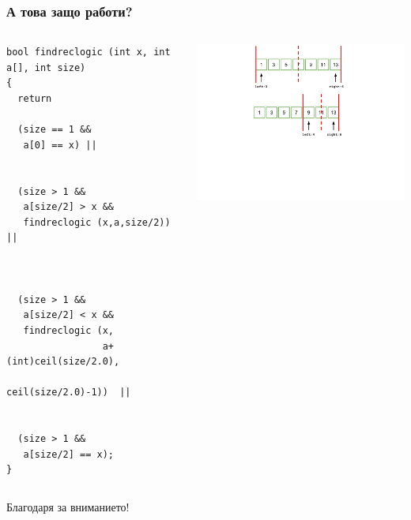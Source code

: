 \documentclass{beamer}
\begin{document}
\begin{frame}[fragile]
\frametitle{А това защо работи?}



\begin{columns}[t]
  \begin{column}{0.5\textwidth}

\begin{lstlisting}
bool findreclogic (int x, int a[], int size)
{
  return 
  
  (size == 1 && 
   a[0] == x) ||


  (size > 1 && 
   a[size/2] > x && 
   findreclogic (x,a,size/2)) ||



  (size > 1 && 
   a[size/2] < x && 
   findreclogic (x,
                 a+(int)ceil(size/2.0),
                 ceil(size/2.0)-1))  ||
  

  (size > 1 && 
   a[size/2] == x);
}
\end{lstlisting}


  \end{column}
  \begin{column}{0.5\textwidth}
\vspace*{-1pt}
\hspace*{-50pt}
\includegraphics[width=10cm]{images/binsearch_smaller} 

  \end{column}
\end{columns}



\end{frame}



\begin{frame}
\centerline{Благодаря за вниманието!}
\end{frame}
\end{document}

